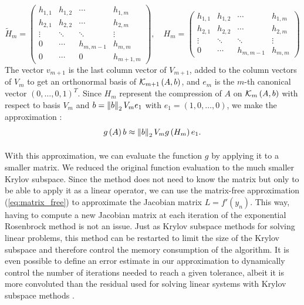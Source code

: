       \begin{equation}
        \tilde{H}_m = \begin{pmatrix}
          h_{1,1} & h_{1,2} & \cdots    & h_{1,m} \\
          h_{2,1} & h_{2,2} & \cdots    & h_{2,m} \\
          \vdots  & \ddots  & \ddots    & \vdots  \\
          0       & \cdots  & h_{m,m-1} & h_{m,m} \\
          0       & \cdots  & 0         & h_{m+1,m}
        \end{pmatrix} , \quad H_m = \begin{pmatrix}
          h_{1,1} & h_{1,2} & \cdots    & h_{1,m} \\
          h_{2,1} & h_{2,2} & \cdots    & h_{2,m} \\
          \vdots  & \ddots  & \ddots    & \vdots  \\
          0       & \cdots  & h_{m,m-1} & h_{m,m}
        \end{pmatrix}
      \end{equation}
      The vector $v_{m+1}$ is the last column vector of $V_{m+1}$, added to the column vectors of $V_m$ to get an orthonormal basis of $\krylov[A, b]{m+1}$, and $e_m$ is the $m$-th canonical vector $\left(0, \dots, 0, 1\right)^T$.
      Since $H_m$ represent the compression of $A$ on $\krylov[A, b]{m}$ with respect to basis $V_m$ and $b = \norm[2]{b} V_m e_1$ with $e_1 = \left(1, 0, \dots, 0\right)$, we make the approximation \cite{EiermannErnst2006}:
      \begin{equation}
        g\left(A\right)b \approx \norm[2]{b} V_m g\left(H_m\right) e_1 .
      \end{equation}

      \paragraph{}
      With this approximation, we can evaluate the function $g$ by applying it to a smaller matrix.
      We reduced the original function evaluation to the much smaller Krylov subspace.
      Since the method does not need to know the matrix but only to be able to apply it as a linear operator, we can use the matrix-free approximation (\ref{eq:matrix_free}) to approximate the Jacobian matrix $L = f'\left(y_n\right)$.
      This way, having to compute a new Jacobian matrix at each iteration of the exponential Rosenbrock method is not an issue.
      Just as Krylov subspace methods for solving linear problems, this method can be restarted to limit the size of the Krylov subspace and therefore control the memory consumption of the algorithm.
      It is even possible to define an error estimate in our approximation to dynamically control the number of iterations needed to reach a given tolerance, albeit it is more convoluted than the residual used for solving linear systems with Krylov subspace methods \cite{EiermannErnst2006}.

